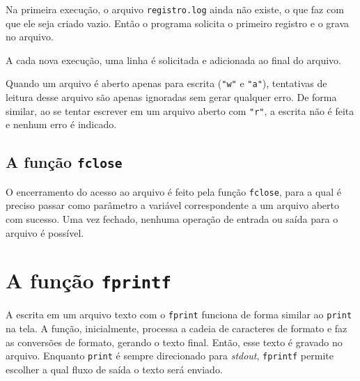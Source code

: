 \documentclass[
  11pt,
  a4paper,
]{scrbook}
\begin{document}
Na primeira execução, o arquivo \texttt{registro.log} ainda não existe,
o que faz com que ele seja criado vazio. Então o programa solicita o
primeiro registro e o grava no arquivo.

A cada nova execução, uma linha é solicitada e adicionada ao final do
arquivo.

\begin{tcolorbox}[enhanced jigsaw, arc=.35mm, bottomtitle=1mm, colbacktitle=quarto-callout-warning-color!10!white, title=\textcolor{quarto-callout-warning-color}{\faExclamationTriangle}\hspace{0.5em}{Curiosidade}, toprule=.15mm, left=2mm, opacityback=0, colback=white, colframe=quarto-callout-warning-color-frame, opacitybacktitle=0.6, bottomrule=.15mm, leftrule=.75mm, toptitle=1mm, coltitle=black, titlerule=0mm, rightrule=.15mm, breakable]

Quando um arquivo é aberto apenas para escrita (\texttt{"w"} e
\texttt{"a"}), tentativas de leitura desse arquivo são apenas ignoradas
sem gerar qualquer erro. De forma similar, ao se tentar escrever em um
arquivo aberto com \texttt{"r"}, a escrita não é feita e nenhum erro é
indicado.

\end{tcolorbox}

\subsection{\texorpdfstring{A função
\texttt{fclose}}{A função fclose}}\label{a-funuxe7uxe3o-fclose}

O encerramento do acesso ao arquivo é feito pela função \texttt{fclose},
para a qual é preciso passar como parâmetro a variável correspondente a
um arquivo aberto com sucesso. Uma vez fechado, nenhuma operação de
entrada ou saída para o arquivo é possível.

\section{\texorpdfstring{A função
\texttt{fprintf}}{A função fprintf}}\label{a-funuxe7uxe3o-fprintf}

 A escrita em um arquivo texto
com o \texttt{fprint} funciona de forma similar ao \texttt{print} na
tela. A função, inicialmente, processa a cadeia de caracteres de formato
e faz as conversões de formato, gerando o texto final. Então, esse texto
é gravado no arquivo. Enquanto \texttt{print} é sempre direcionado para
\emph{stdout}, \texttt{fprintf} permite escolher a qual fluxo de saída o
texto será enviado.
\end{document}
